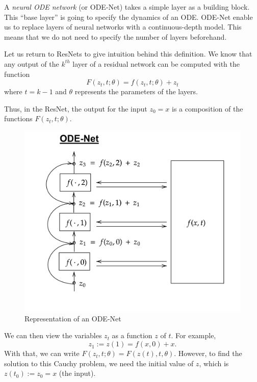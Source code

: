 \documentclass[10pt,a4paper]{article}
\theoremstyle{definition}
\theoremstyle{plain}
\begin{document}
A \textit{neural ODE network} (or ODE-Net) \cite{2,3,12} takes a simple layer as a building block. This “base layer” is going to specify the dynamics of an ODE.
ODE-Net enable us to replace layers of neural networks with a continuous-depth model. This means that we do not need to specify the number of layers beforehand.

Let us return to ResNets to give intuition behind this definition. We know that any output of the $k^{th}$ layer of a residual network can be computed with the function
\begin{equation*}
F(z_t, t; \theta) = f(z_t, t;\theta) + z_t
\end{equation*}
where $t = k - 1$ and $\theta$ represents the parameters of the layers.

Thus, in the ResNet, the output for the input $z_0 = x$ is a composition of the functions $F(z_t, t; \theta)$.


\begin{figure}
\center
\includegraphics[scale=0.18]{ODENet.png}
\caption{Representation of an ODE-Net}
\end{figure}

We can then view the variables $z_t$ as a function $z$ of $t$. For example,
\begin{equation*}
z_1 := z(1) = f(x, 0) + x.
\end{equation*}
With that, we can write $F(z_t, t; \theta) = F(z(t), t, \theta)$. However, to find the solution to this Cauchy problem, we need the initial value of $z$, which is $z(t_0) := z_0 = x$ (the input).
\end{document}
